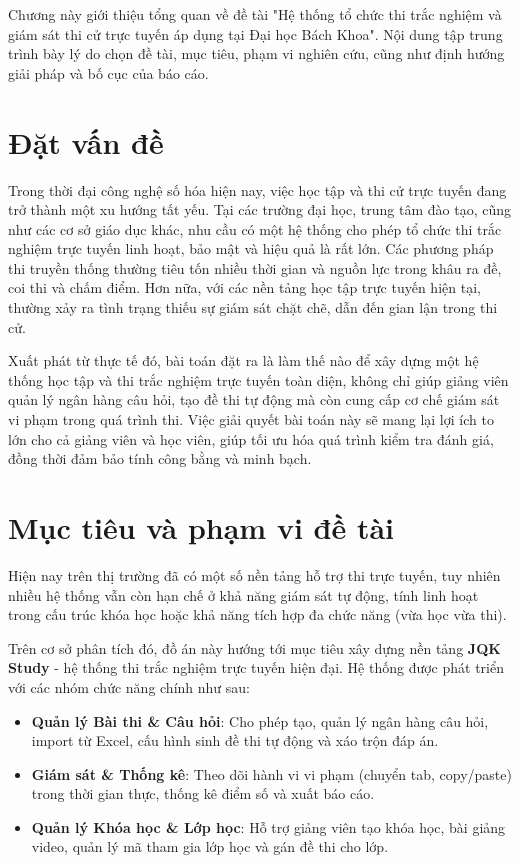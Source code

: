 \documentclass[../DoAn.tex]{subfiles}
\begin{document}
Chương này giới thiệu tổng quan về đề tài "Hệ thống tổ chức thi trắc nghiệm và giám sát thi cử trực tuyến áp dụng tại Đại học Bách Khoa". Nội dung tập trung trình bày lý do chọn đề tài, mục tiêu, phạm vi nghiên cứu, cũng như định hướng giải pháp và bố cục của báo cáo.

\section{Đặt vấn đề}
\label{section:1.1}
Trong thời đại công nghệ số hóa hiện nay, việc học tập và thi cử trực tuyến đang trở thành một xu hướng tất yếu. Tại các trường đại học, trung tâm đào tạo, cũng như các cơ sở giáo dục khác, nhu cầu có một hệ thống cho phép tổ chức thi trắc nghiệm trực tuyến linh hoạt, bảo mật và hiệu quả là rất lớn. Các phương pháp thi truyền thống thường tiêu tốn nhiều thời gian và nguồn lực trong khâu ra đề, coi thi và chấm điểm. Hơn nữa, với các nền tảng học tập trực tuyến hiện tại, thường xảy ra tình trạng thiếu sự giám sát chặt chẽ, dẫn đến gian lận trong thi cử.

Xuất phát từ thực tế đó, bài toán đặt ra là làm thế nào để xây dựng một hệ thống học tập và thi trắc nghiệm trực tuyến toàn diện, không chỉ giúp giảng viên quản lý ngân hàng câu hỏi, tạo đề thi tự động mà còn cung cấp cơ chế giám sát vi phạm trong quá trình thi. Việc giải quyết bài toán này sẽ mang lại lợi ích to lớn cho cả giảng viên và học viên, giúp tối ưu hóa quá trình kiểm tra đánh giá, đồng thời đảm bảo tính công bằng và minh bạch.

\section{Mục tiêu và phạm vi đề tài}
\label{section:1.2}
Hiện nay trên thị trường đã có một số nền tảng hỗ trợ thi trực tuyến, tuy nhiên nhiều hệ thống vẫn còn hạn chế ở khả năng giám sát tự động, tính linh hoạt trong cấu trúc khóa học hoặc khả năng tích hợp đa chức năng (vừa học vừa thi). 

Trên cơ sở phân tích đó, đồ án này hướng tới mục tiêu xây dựng nền tảng \textbf{JQK Study} - hệ thống thi trắc nghiệm trực tuyến hiện đại. Hệ thống được phát triển với các nhóm chức năng chính như sau:
\begin{itemize}
    \item \textbf{Quản lý Bài thi \& Câu hỏi}: Cho phép tạo, quản lý ngân hàng câu hỏi, import từ Excel, cấu hình sinh đề thi tự động và xáo trộn đáp án.
    \item \textbf{Giám sát \& Thống kê}: Theo dõi hành vi vi phạm (chuyển tab, copy/paste) trong thời gian thực, thống kê điểm số và xuất báo cáo.
    \item \textbf{Quản lý Khóa học \& Lớp học}: Hỗ trợ giảng viên tạo khóa học, bài giảng video, quản lý mã tham gia lớp học và gán đề thi cho lớp.
\end{itemize}
\end{document}
